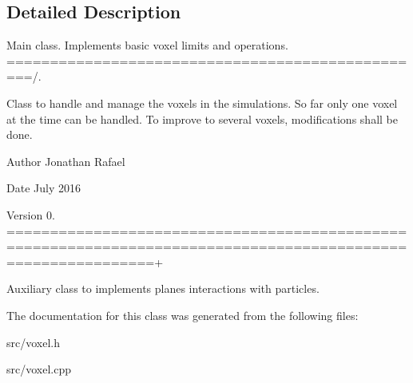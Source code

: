\subsection{Detailed Description}
Main class. Implements basic voxel limits and operations. =================================================/. 

Class to handle and manage the voxels in the simulations. So far only one voxel at the time can be handled. To improve to several voxels, modifications shall be done.

\begin{DoxyAuthor}{Author}
Jonathan Rafael 
\end{DoxyAuthor}
\begin{DoxyDate}{Date}
July 2016 
\end{DoxyDate}
\begin{DoxyVersion}{Version}
0. =============================================================================================================+
\end{DoxyVersion}
Auxiliary class to implements plane\textquotesingle{}s interactions with particles. 

The documentation for this class was generated from the following files\+:\begin{DoxyCompactItemize}
\item 
src/voxel.\+h\item 
src/voxel.\+cpp\end{DoxyCompactItemize}
